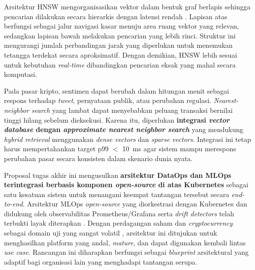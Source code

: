 \begin{enumerate}
    \vspace{0.5em}

    Arsitektur HNSW mengorganisasikan vektor dalam bentuk graf berlapis sehingga pencarian dilakukan secara hierarkis dengan latensi rendah \autocite{malkov2020efficient}. Lapisan atas berfungsi sebagai jalur navigasi kasar menuju area ruang vektor yang relevan, sedangkan lapisan bawah melakukan pencarian yang lebih rinci. Struktur ini mengurangi jumlah perbandingan jarak yang diperlukan untuk menemukan tetangga terdekat secara aproksimatif. Dengan demikian, HNSW lebih sesuai untuk kebutuhan \textit{real-time} dibandingkan pencarian eksak yang mahal secara komputasi.
    
    \vspace{0.5em}

    Pada pasar kripto, sentimen dapat berubah dalam hitungan menit sebagai respons terhadap \textit{tweet}, pernyataan publik, atau perubahan regulasi. \textit{Nearest-neighbor search} yang lambat dapat menyebabkan peluang transaksi bernilai tinggi hilang sebelum dieksekusi. Karena itu, diperlukan \textbf{integrasi \textit{vector database} dengan \textit{approximate nearest neighbor search}} yang mendukung \textit{hybrid retrieval} menggunakan \textit{dense vectors} dan \textit{sparse vectors}. Integrasi ini tetap harus mempertahankan target p99 $<$ 10~ms agar sistem mampu merespons perubahan pasar secara konsisten dalam skenario dunia nyata.

    \vspace{0.5em}
\end{enumerate}

Proposal tugas akhir ini mengusulkan \textbf{arsitektur DataOps dan MLOps terintegrasi berbasis komponen \textit{open-source} di atas Kubernetes} sebagai satu kesatuan sistem untuk menangani keempat tantangan tersebut secara \textit{end-to-end}. Arsitektur MLOps \textit{open-source} yang diorkestrasi dengan Kubernetes dan didukung oleh observabilitas Prometheus/Grafana serta \textit{drift detectors} telah terbukti layak diterapkan \autocite{burgueno2025toward}. Dengan perdagangan saham dan \textit{cryptocurrency} sebagai domain uji yang sangat volatil \autocite{rodrigues2025architecture}, arsitektur ini ditujukan untuk menghasilkan platform yang andal, \textit{mature}, dan dapat digunakan kembali lintas \textit{use case}. Rancangan ini diharapkan berfungsi sebagai \textit{blueprint} arsitektural yang adaptif bagi organisasi lain yang menghadapi tantangan serupa.

